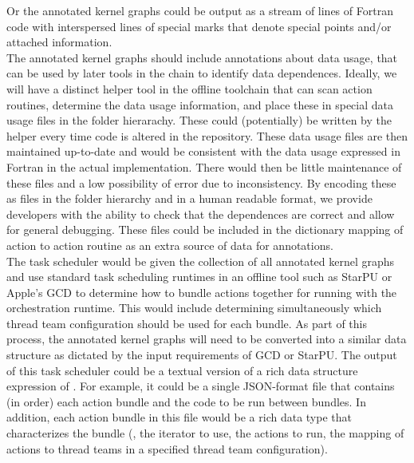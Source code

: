 \documentclass{article}
\begin{document}
Or the annotated kernel graphs could be output
as a stream of lines of Fortran code with interspersed lines of special marks
that denote special points and/or attached information.
\\

The annotated kernel graphs should include annotations about data
usage, that can be used by later tools in the chain to identify data
dependences.  Ideally, we will have a distinct helper tool in the offline
toolchain that can scan action routines, determine the data usage information,
and place these in special data usage files in the \FlashOfTheFuture folder
hierarachy.  These could (potentially) be written by the helper every time code
is altered in the repository.  These data usage files are then maintained
up-to-date and would be consistent with the data usage
expressed in Fortran in the actual implementation.  There would then be little
maintenance of these files and a low possibility of error due to inconsistency.
By encoding these as files in the folder hierarchy and in a human readable
format, we provide developers with the ability to check that the dependences
are correct and allow for general debugging.  These files could be included in the
dictionary mapping of action to action routine as an extra source of data
for annotations.\\

The task scheduler would be given the collection of all annotated kernel graphs
and use standard task scheduling runtimes in an offline tool such as StarPU
or Apple's GCD to determine how to bundle actions together for running with the
orchestration runtime.  This would include determining simultaneously which
thread team configuration should be used for each bundle.  As part of this
process, the annotated kernel graphs will need to be converted into a similar
data structure as dictated by the input requirements of GCD or StarPU.  The
output of this task scheduler could be a textual version of a rich data
structure expression of .  For example, it could be a
single JSON-format file that contains (in order) each action bundle and the code
to be run between bundles.  In addition, each action bundle in this file would
be a rich data type that characterizes the bundle (\eg, the iterator to use, the
actions to run, the mapping of actions to thread teams in a specified thread
team configuration).\\
\end{document}
